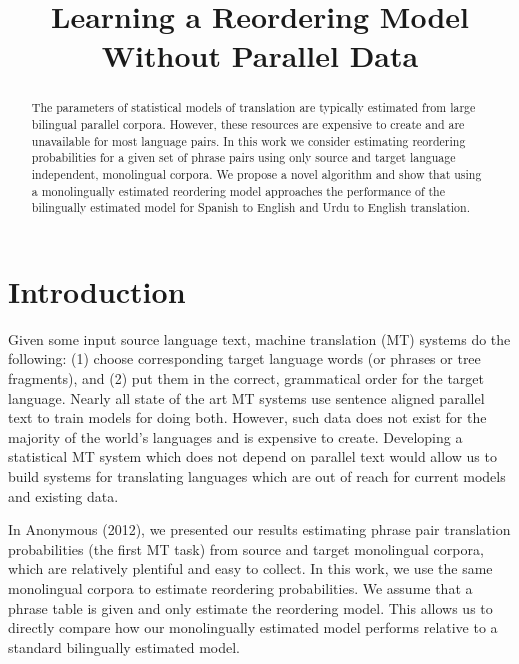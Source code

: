 \documentclass[11pt,letterpaper]{article}
\title{Learning a Reordering Model Without Parallel Data}
\date{}
\begin{document}
\maketitle

\begin{abstract}
The parameters of statistical models of translation are typically estimated from large bilingual parallel corpora.  However, these resources are expensive to create and are unavailable for most language pairs.  In this work we consider estimating reordering probabilities for a given set of phrase pairs using only source and target language independent, monolingual corpora. We propose a novel algorithm and show that using a monolingually estimated reordering model approaches the performance of the bilingually estimated model for Spanish to English and Urdu to English translation.
\end{abstract}

\section{Introduction}

Given some input source language text, machine translation (MT) systems do the following: (1) choose corresponding target language words (or phrases or tree fragments), and (2) put them in the correct, grammatical order for the target language. Nearly all state of the art MT systems use sentence aligned parallel text to train models for doing both. However, such data does not exist for the majority of the world's languages and is expensive to create. Developing a statistical MT system which does not depend on parallel text would allow us to build systems for translating languages which are out of reach for current models and existing data. 

In Anonymous (2012), we presented our results estimating phrase pair translation probabilities (the first MT task) from source and target monolingual corpora, which are relatively plentiful and easy to collect. In this work, we use the same monolingual corpora to estimate reordering probabilities. We assume that a phrase table is given and only estimate the reordering model. This allows us to directly compare how our monolingually estimated model performs relative to a standard bilingually estimated model.

\end{document}
